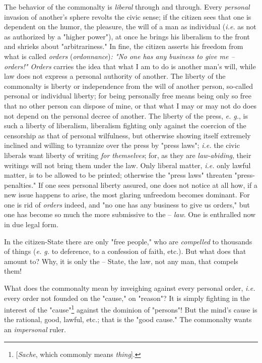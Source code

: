 \documentclass[a4paper]{book}
\begin{document}
The behavior of the commonalty is \textit{liberal} through and through. Every 
\textit{personal} invasion of another's sphere revolts the civic sense; if the 
citizen sees that one is dependent on the humor, the pleasure, the will of a 
man as individual (\textit{i.e.} as not as authorized by a "{}higher 
power"{}), at once he brings his liberalism to the front and shrieks about 
"{}arbitrariness."{} In fine, the citizen asserts his freedom from what is 
called \textit{orders} (\textit{ordonnance})\textit{: "{}No one has any 
business to give me -- orders!"{} Orders} carries the idea that what I am to 
do is another man's will, while law does not express a personal authority of 
another. The liberty of the commonalty is liberty or independence from the 
will of another person, so-called personal or individual liberty; for being 
personally free means being only so free that no other person can dispose of 
mine, or that what I may or may not do does not depend on the personal decree 
of another. The liberty of the press, \textit{e. g.}, is such a liberty of 
liberalism, liberalism fighting only against the coercion of the censorship as 
that of personal wilfulness, but otherwise showing itself extremely inclined 
and willing to tyrannize over the press by "{}press laws"{}; \textit{i.e.} the 
civic liberals want liberty of writing \textit{for themselves}; for, as they 
are \textit{law-abiding}, their writings will not bring them under the law. 
Only liberal matter, \textit{i.e.} only lawful matter, is to be allowed to be 
printed; otherwise the "{}press laws"{} threaten "{}press-penalties."{} If one 
sees personal liberty assured, one does not notice at all how, if a new issue 
happens to arise, the most glaring unfreedom becomes dominant. For one is rid 
of \textit{orders} indeed, and "{}no one has any business to give us 
orders,"{} but one has become so much the more submissive to the -- 
\textit{law}. One is enthralled now in due legal form.

In the citizen-State there are only "{}free people,"{} who are 
\textit{compelled} to thousands of things (\textit{e. g.} to deference, to a 
confession of faith, etc.). But what does that amount to? Why, it is only the 
-- State, the law, not any man, that compels them!

What does the commonalty mean by inveighing against every personal order, 
\textit{i.e.} every order not founded on the "{}cause,"{} on "{}reason"{}? It 
is simply fighting in the interest of the 
"{}cause"{}\footnote{[\textit{Sache}, which commonly means \textit{thing}].} 
against the dominion of "{}persons"{}! But the mind's cause is the rational, 
good, lawful, etc.; that is the "{}good cause."{} The commonalty wants an 
\textit{impersonal} ruler.
\end{document}
